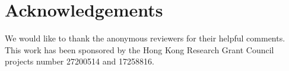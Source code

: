 \documentclass[sigplan,screen]{acmart}\settopmatter{}
\begin{document}




\maketitle


















\vspace{-6pt}
\section*{Acknowledgements}
We would like to thank the anonymous reviewers for their helpful comments. This work has been sponsored by the Hong Kong Research Grant Council projects number 27200514 and 17258816.
\vspace{-6pt}





\end{document}
